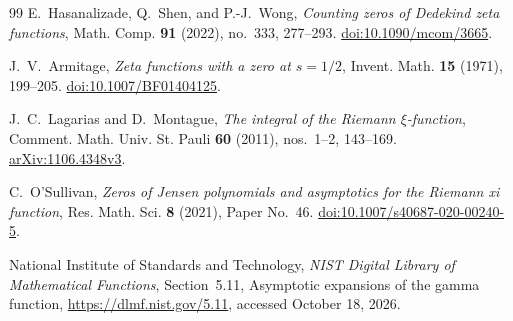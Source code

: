 \documentclass[11pt,reqno]{amsart}
\numberwithin{equation}{section}
\begin{document}
\begin{thebibliography}{99}
E.~Hasanalizade, Q.~Shen, and P.-J.~Wong,
\emph{Counting zeros of Dedekind zeta functions},
Math. Comp. \textbf{91} (2022), no.~333, 277--293.
\href{https://doi.org/10.1090/mcom/3665}{doi:10.1090/mcom/3665}.

J.~V.~Armitage,
\emph{Zeta functions with a zero at $s=1/2$},
Invent. Math. \textbf{15} (1971), 199--205.
\href{https://doi.org/10.1007/BF01404125}{doi:10.1007/BF01404125}.

J.~C.~Lagarias and D.~Montague,
\emph{The integral of the Riemann $\xi$-function},
Comment. Math. Univ. St. Pauli \textbf{60} (2011), nos.~1--2, 143--169.
\href{https://arxiv.org/abs/1106.4348v3}{arXiv:1106.4348v3}.

C.~O'Sullivan,
\emph{Zeros of Jensen polynomials and asymptotics for the Riemann xi function},
Res. Math. Sci. \textbf{8} (2021), Paper No.~46.
\href{https://doi.org/10.1007/s40687-020-00240-5}{doi:10.1007/s40687-020-00240-5}.

National Institute of Standards and Technology,
\emph{NIST Digital Library of Mathematical Functions},
Section~5.11, Asymptotic expansions of the gamma function,
\url{https://dlmf.nist.gov/5.11}, accessed October 18, 2026.

\end{thebibliography}
\end{document}
